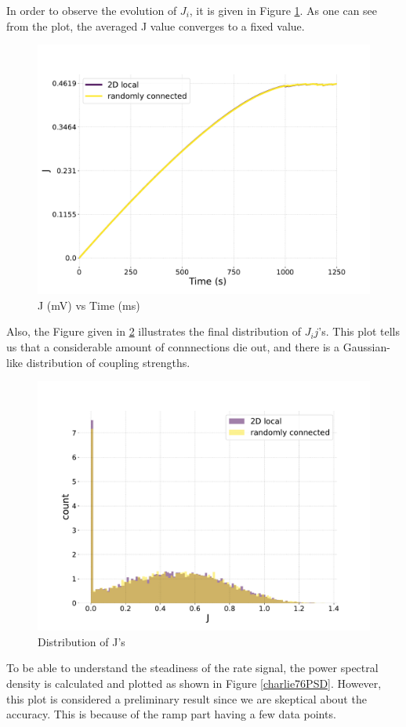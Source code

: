 \documentclass[a4paper,12pt]{article}
\begin{document}
In order to observe the evolution of $J_i$, it is given in Figure \ref{charlie76alphavstime}. As one can see from the plot, the averaged J value converges to a fixed value. 
\begin{figure}[H] 
    \centering
    \includegraphics[width=0.8\linewidth]{nu_ext_76alpha_over_time_homeostasis.pdf}
    \caption{ J (mV) vs Time (ms)}
    \label{charlie76alphavstime}
\end{figure}
Also, the Figure given in \ref{charlie76histogram} illustrates the final distribution of $J_ij$'s. This plot tells us that a considerable amount of connnections die out, and there is a Gaussian-like distribution of coupling strengths.
\begin{figure}[H] 
    \centering
    \includegraphics[width=0.8\linewidth]{nu_ext_76j_dist.pdf}
    \caption{Distribution of J's}
    \label{charlie76histogram}
\end{figure}
To be able to understand the steadiness of the rate signal, the power spectral density is calculated and plotted as shown in Figure \ref{charlie76PSD}. However, this plot is considered a preliminary result since we are skeptical about the accuracy. This is because of the ramp part having a few data points.  
\end{document}
